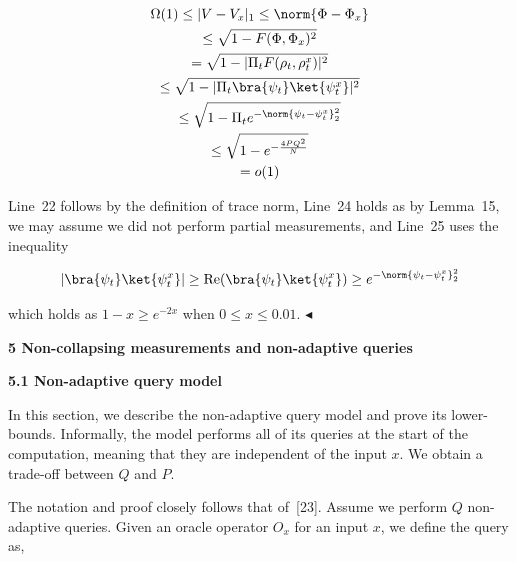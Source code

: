 \[\begin{gathered}
\displaystyle\Omega(1)\leq|V-V_{x}|_{1} \displaystyle\leq\norm{\Phi-\Phi_{x}} \\
\displaystyle\leq\sqrt{1-F(\Phi,\Phi_{x})^{2}} \\
\displaystyle=\sqrt{1-|\Pi_{t}F(\rho_{t},\rho_{t}^{x})|^{2}} \\
\displaystyle\leq\sqrt{1-|\Pi_{t}\bra{\psi_{t}}\ket{\psi_{t}^{x}}|^{2}} \\
\displaystyle\leq\sqrt{1-\Pi_{t}e^{-\norm{\psi_{t}-\psi_{t}^{x}}^{2}_{2}}} \\
\displaystyle\leq\sqrt{1-e^{-\frac{4PQ^{2}}{N}}} \\
\displaystyle=o(1)
\end{gathered}\]




Line 22 follows by the definition of trace norm, Line 24 holds as by Lemma 15, we may assume we did not perform partial measurements, and Line 25 uses the inequality\par


\[\begin{gathered}
\displaystyle|\bra{\psi_{t}}\ket{\psi_{t}^{x}}|\geq\text{Re}(\bra{\psi_{t}}\ket{\psi_{t}^{x}})\geq e^{-\norm{\psi_{t}-\psi_{t}^{x}}^{2}_{2}}
\end{gathered}\]


which holds as $1-x\geq e^{-2x}$ when $0\leq x\leq 0.01$.
$\blacktriangleleft$\par







\par\medskip\noindent\textbf{
5 Non-collapsing measurements and non-adaptive queries}\par




\par\medskip\noindent\textbf{
5.1 Non-adaptive query model}\par




In this section, we describe the non-adaptive query model and prove its lower-bounds. Informally, the model performs all of its queries at the start of the computation, meaning that they are independent of the input $x$. We obtain a trade-off between $Q$ and $P$.\par




The notation and proof closely follows that of [23]. Assume we perform $Q$ non-adaptive queries. Given an oracle operator $O_{x}$ for an input $x$, we define the query as,\par


